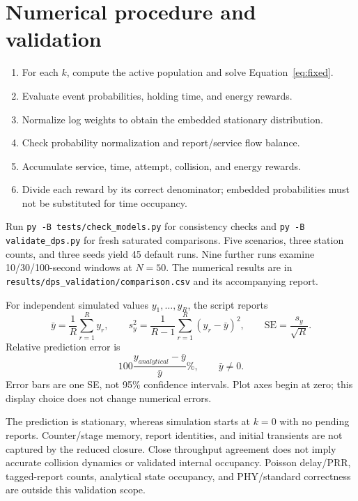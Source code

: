 \documentclass[11pt,a4paper]{article}
\begin{document}
\section{Numerical procedure and validation}
\begin{enumerate}
\item For each $k$, compute the active population and solve
Equation~\eqref{eq:fixed}.
\item Evaluate event probabilities, holding time, and energy rewards.
\item Normalize log weights to obtain the embedded stationary distribution.
\item Check probability normalization and report/service flow balance.
\item Accumulate service, time, attempt, collision, and energy rewards.
\item Divide each reward by its correct denominator; embedded probabilities
must not be substituted for time occupancy.
\end{enumerate}
Run \texttt{py -B tests/check\_models.py} for consistency checks and
\texttt{py -B validate\_dps.py} for fresh saturated comparisons. Five
scenarios, three station counts, and three seeds yield 45 default runs.
Nine further runs examine 10/30/100-second windows at $N=50$.
The numerical results are in
\texttt{results/dps\_validation/comparison.csv} and its accompanying report.

For independent simulated values $y_1,\ldots,y_R$, the script reports
\begin{equation}
\bar y=\frac1R\sum_{r=1}^{R}y_r,\qquad
s_y^2=\frac1{R-1}\sum_{r=1}^{R}(y_r-\bar y)^2,\qquad
\mathrm{SE}=\frac{s_y}{\sqrt R}.
\end{equation}
Relative prediction error is
\begin{equation}
100\frac{y_{analytical}-\bar y}{\bar y}\%,\qquad\bar y\ne0.
\end{equation}
Error bars are one SE, not 95\% confidence intervals. Plot axes begin at
zero; this display choice does not change numerical errors.

The prediction is stationary, whereas simulation starts at $k=0$ with no
pending reports. Counter/stage memory, report identities, and initial
transients are not captured by the reduced closure. Close throughput
agreement does not imply accurate collision dynamics or validated internal
occupancy. Poisson delay/PRR, tagged-report counts, analytical state
occupancy, and PHY/standard correctness are outside this validation scope.
\end{document}
